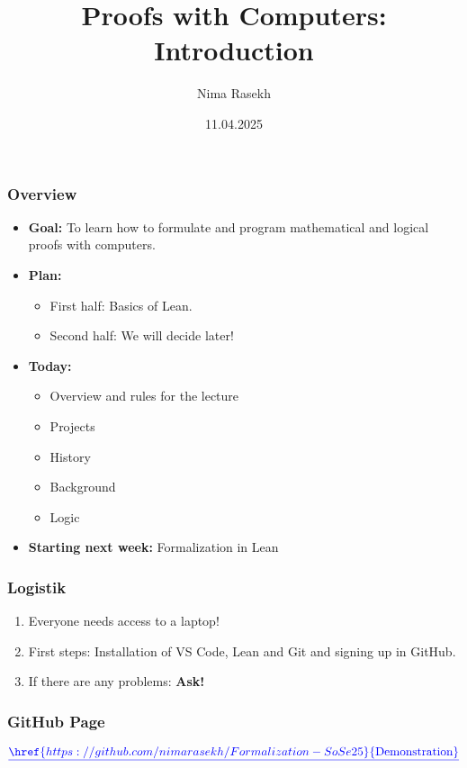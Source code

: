 \documentclass{beamer}
\title[Proofs with Computers \hspace{2.7cm}]{
Proofs with Computers: Introduction}
\date{11.04.2025}
\author[Nima Rasekh]{Nima Rasekh}
\institute{Universit{\"a}t Greifswald \vspace{0.05in} \\ \texttt{[image: greifswald.jpg]} \vspace{-0.1in}}
\theoremstyle{definition}
\theoremstyle{remark}
\begin{document}
\begin{frame}
 \maketitle
\end{frame}

\begin{frame}
	\frametitle{Overview}
	\begin{itemize}
		\item \textbf{Goal:} To learn how to formulate and program mathematical and logical proofs with computers.
		\item \textbf{Plan:} 
		\begin{itemize}
			\item First half: Basics of Lean.
			\item Second half: We will decide later! 
		\end{itemize}
		\item \textbf{Today:} 
		\begin{itemize}
			\item Overview and rules for the lecture
			\item Projects
			\item History 
			\item Background
			\item Logic
		\end{itemize} 
		\item \textbf{Starting next week:} Formalization in Lean
	\end{itemize}
\end{frame}

\begin{frame}
 \frametitle{Logistik}
	\begin{enumerate}
		\item Everyone needs access to a laptop!
		\item First steps: Installation of VS Code, Lean and Git and signing up in GitHub.
		\item If there are any problems: \textbf{Ask!}
	\end{enumerate}

\end{frame}

\begin{frame}
 \frametitle{GitHub Page}
	\[
		{\color{blue}\underline{\href{https://github.com/nimarasekh/Formalization-SoSe25}{\text{Demonstration}}}}
	\]
\end{frame}
\end{document}
